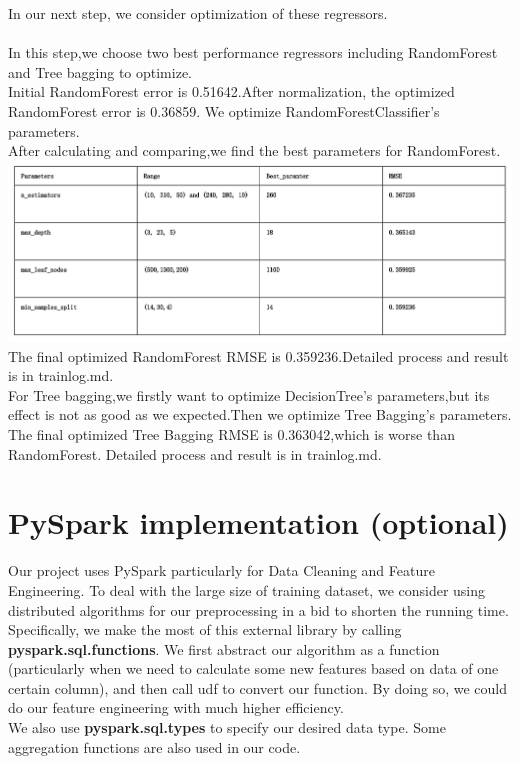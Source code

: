 \documentclass{article}
\begin{document}
In our next step, we consider optimization of these regressors.
\\
\\In this step,we choose two best performance regressors including RandomForest and Tree bagging to optimize.
\\Initial RandomForest error is 0.51642.After normalization, the optimized RandomForest error is 0.36859.
We optimize RandomForestClassifier's parameters.
\\After calculating and comparing,we find the best parameters for RandomForest.\\
\includegraphics[width=1\linewidth]{optimization.png}
The final optimized RandomForest RMSE is 0.359236.Detailed process and result is in trainlog.md.
\\For Tree bagging,we firstly want to optimize DecisionTree's parameters,but its effect is not as good as we expected.Then we optimize Tree Bagging's parameters.
\\The final optimized Tree Bagging RMSE is 0.363042,which is worse than RandomForest. Detailed process and result is in trainlog.md.
\section{PySpark implementation (optional)}
Our project uses PySpark particularly for Data Cleaning and Feature Engineering. To deal with the large size of training dataset,
we consider using distributed algorithms for our preprocessing in a bid to shorten the running time.\\
Specifically, we make the most of this external library by calling \textbf{pyspark.sql.functions}. We first abstract our algorithm as a function
(particularly when we need to calculate some new features based on data of one certain column), and then call udf to convert our function.
By doing so, we could do our feature engineering with much higher efficiency.\\
We also use \textbf{pyspark.sql.types} to specify our desired data type.
Some aggregation functions are also used in our code.
\end{document}
